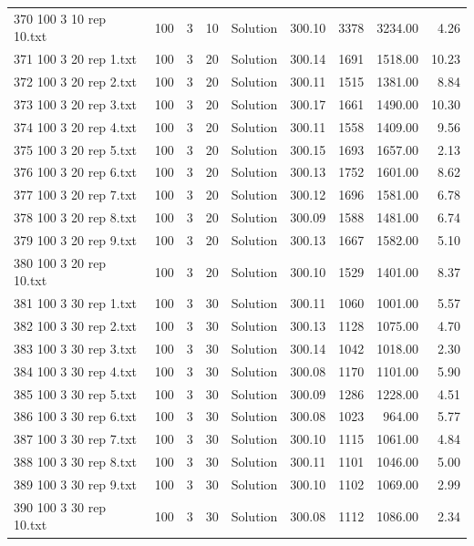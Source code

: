\begin{longtable}{lrrllrrrr}
370 100 3 10 rep 10.txt & 100 & 3 & 10 & Solution & 300.10 & 3378 & 3234.00 &  4.26\\
371 100 3 20 rep 1.txt & 100 & 3 & 20 & Solution & 300.14 & 1691 & 1518.00 & 10.23\\
372 100 3 20 rep 2.txt & 100 & 3 & 20 & Solution & 300.11 & 1515 & 1381.00 &  8.84\\
373 100 3 20 rep 3.txt & 100 & 3 & 20 & Solution & 300.17 & 1661 & 1490.00 & 10.30\\
374 100 3 20 rep 4.txt & 100 & 3 & 20 & Solution & 300.11 & 1558 & 1409.00 &  9.56\\
375 100 3 20 rep 5.txt & 100 & 3 & 20 & Solution & 300.15 & 1693 & 1657.00 &  2.13\\
376 100 3 20 rep 6.txt & 100 & 3 & 20 & Solution & 300.13 & 1752 & 1601.00 &  8.62\\
377 100 3 20 rep 7.txt & 100 & 3 & 20 & Solution & 300.12 & 1696 & 1581.00 &  6.78\\
378 100 3 20 rep 8.txt & 100 & 3 & 20 & Solution & 300.09 & 1588 & 1481.00 &  6.74\\
379 100 3 20 rep 9.txt & 100 & 3 & 20 & Solution & 300.13 & 1667 & 1582.00 &  5.10\\
380 100 3 20 rep 10.txt & 100 & 3 & 20 & Solution & 300.10 & 1529 & 1401.00 &  8.37\\
381 100 3 30 rep 1.txt & 100 & 3 & 30 & Solution & 300.11 & 1060 & 1001.00 &  5.57\\
382 100 3 30 rep 2.txt & 100 & 3 & 30 & Solution & 300.13 & 1128 & 1075.00 &  4.70\\
383 100 3 30 rep 3.txt & 100 & 3 & 30 & Solution & 300.14 & 1042 & 1018.00 &  2.30\\
384 100 3 30 rep 4.txt & 100 & 3 & 30 & Solution & 300.08 & 1170 & 1101.00 &  5.90\\
385 100 3 30 rep 5.txt & 100 & 3 & 30 & Solution & 300.09 & 1286 & 1228.00 &  4.51\\
386 100 3 30 rep 6.txt & 100 & 3 & 30 & Solution & 300.08 & 1023 & 964.00 &  5.77\\
387 100 3 30 rep 7.txt & 100 & 3 & 30 & Solution & 300.10 & 1115 & 1061.00 &  4.84\\
388 100 3 30 rep 8.txt & 100 & 3 & 30 & Solution & 300.11 & 1101 & 1046.00 &  5.00\\
389 100 3 30 rep 9.txt & 100 & 3 & 30 & Solution & 300.10 & 1102 & 1069.00 &  2.99\\
390 100 3 30 rep 10.txt & 100 & 3 & 30 & Solution & 300.08 & 1112 & 1086.00 &  2.34\\

\end{longtable}
